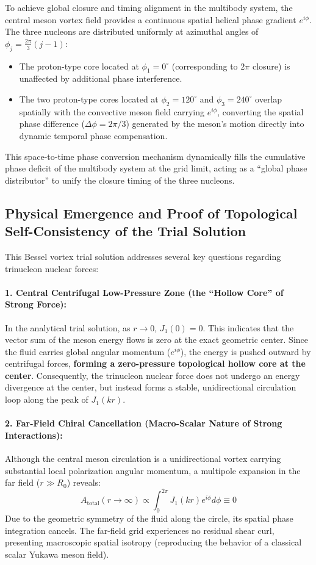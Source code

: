 \documentclass[12pt, a4paper]{article}
\begin{document}
To achieve global closure and timing alignment in the multibody system, the central meson vortex field provides a continuous spatial helical phase gradient $e^{i\phi}$. The three nucleons are distributed uniformly at azimuthal angles of $\phi_j = \frac{2\pi}{3}(j-1)$:
\begin{itemize}
    \item The proton-type core located at $\phi_1 = 0^\circ$ (corresponding to $2\pi$ closure) is unaffected by additional phase interference.
    \item The two proton-type cores located at $\phi_2 = 120^\circ$ and $\phi_3 = 240^\circ$ overlap spatially with the convective meson field carrying $e^{i\phi}$, converting the spatial phase difference ($\Delta \phi = 2\pi/3$) generated by the meson's motion directly into dynamic temporal phase compensation.
\end{itemize}
This space-to-time phase conversion mechanism dynamically fills the cumulative phase deficit of the multibody system at the grid limit, acting as a ``global phase distributor'' to unify the closure timing of the three nucleons.

\subsection{Physical Emergence and Proof of Topological Self-Consistency of the Trial Solution}

This Bessel vortex trial solution addresses several key questions regarding trinucleon nuclear forces:

\paragraph{1. Central Centrifugal Low-Pressure Zone (the ``Hollow Core'' of Strong Force):}
In the analytical trial solution, as $r \to 0$, $J_1(0) = 0$. This indicates that the vector sum of the meson energy flows is zero at the exact geometric center. Since the fluid carries global angular momentum ($e^{i\phi}$), the energy is pushed outward by centrifugal forces, \textbf{forming a zero-pressure topological hollow core at the center}. Consequently, the trinucleon nuclear force does not undergo an energy divergence at the center, but instead forms a stable, unidirectional circulation loop along the peak of $J_1(kr)$.

\paragraph{2. Far-Field Chiral Cancellation (Macro-Scalar Nature of Strong Interactions):}
Although the central meson circulation is a unidirectional vortex carrying substantial local polarization angular momentum, a multipole expansion in the far field ($r \gg R_0$) reveals:
\begin{equation}
A_{\mathrm{total}}(r \to \infty) \propto \int_{0}^{2\pi} J_1(kr) e^{i\phi} d\phi \equiv 0
\end{equation}
Due to the geometric symmetry of the fluid along the circle, its spatial phase integration cancels. The far-field grid experiences no residual shear curl, presenting macroscopic spatial isotropy (reproducing the behavior of a classical scalar Yukawa meson field).
\end{document}
